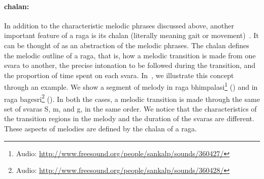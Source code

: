 \paragraph{\Gls{chalan}:} In addition to the characteristic melodic phrases discussed above, another important feature of a \gls{raga} is its \gls{chalan} (literally meaning gait or movement)~\citep{rao1999raga,Bagchee1998,Suvarnalata2014}. It can be thought of as an abstraction of the melodic phrases. The \gls{chalan} defines the melodic outline of a \gls{raga}, that is, how a melodic transition is made from one \gls{svara} to another, the precise intonation to be followed during the transition, and the proportion of time spent on each \gls{svara}. In~, we illustrate this concept through an example. We show a segment of melody in \gls{raga} \gls{bhimpalasi}\footnote{Audio: \url{http://www.freesound.org/people/sankalp/sounds/360427/}} () and in \gls{raga} \gls{bagesri}\footnote{Audio: \url{http://www.freesound.org/people/sankalp/sounds/360428/}} (). In both the cases, a melodic transition is made through the same set of \glspl{svara} S, m, and g, in the same order. We notice that the characteristics of the transition regions in the melody and the duration of the \glspl{svara} are different. These aspects of melodies are defined by the \gls{chalan} of a \gls{raga}.

